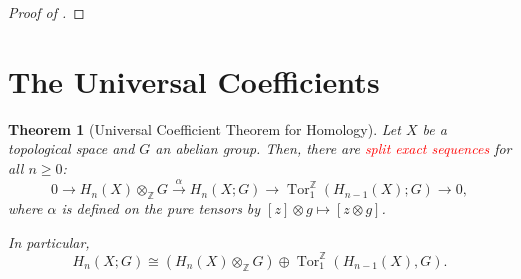 \documentclass[10pt]{article}
\theoremstyle{thmstyle}
\newtheorem{theorem}{Theorem}[section]
\theoremstyle{defstyle}
\newcommand{\Z}{\mathbb{Z}}
\newcommand{\Tor}{\operatorname{Tor}}
\newcommand{\important}[1]{\textcolor{red}{\textit{#1}}}
\renewcommand{\ge}{\geqslant}
\begin{document}
\begin{proof}[Proof of ]
    
\end{proof}

\section{The Universal Coefficients}

\begin{theorem}[Universal Coefficient Theorem for Homology]
    Let $X$ be a topological space and $G$ an abelian group. Then, there are \important{split exact sequences} for all $n\ge 0$:
    \begin{equation*}
        0\to H_n(X)\otimes_{\Z}G\stackrel{\alpha}{\longrightarrow} H_n(X; G)\longrightarrow\Tor^{\Z}_1(H_{n - 1}(X); G)\to 0,
    \end{equation*}
    where $\alpha$ is defined on the pure tensors by $[z]\otimes g\mapsto [z\otimes g]$.

    In particular, 
    \begin{equation*}
        H_n(X; G)\cong \left(H_n(X)\otimes_{\Z} G\right)\oplus\Tor^{\Z}_1(H_{n - 1}(X), G).
    \end{equation*}
\end{theorem}
\end{document}
